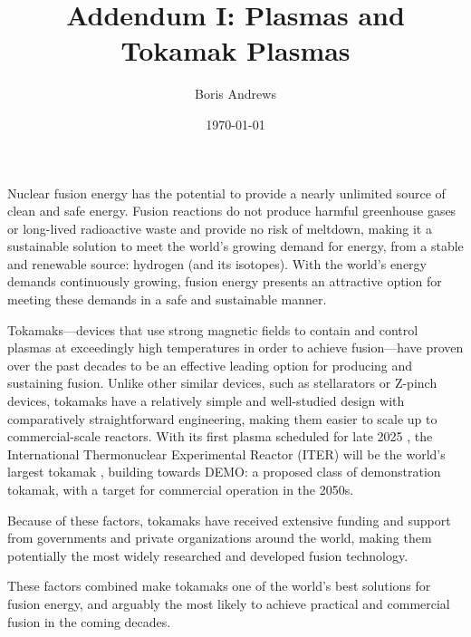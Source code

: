 \documentclass[12pt, a4paper]{article}
\title{Addendum I: Plasmas and Tokamak Plasmas}
\author{Boris Andrews}
\affil{Mathematical Institute, University of Oxford}
\date{\today}
\begin{document}
    \maketitle
    
    
    \tableofcontents
    \line


    Nuclear fusion energy has the potential to provide a nearly unlimited source of clean and safe energy. Fusion reactions do not produce harmful greenhouse gases or long-lived radioactive waste and provide no risk of meltdown, making it a sustainable solution to meet the world's growing demand for energy, from a stable and renewable source: hydrogen (and its isotopes). With the world's energy demands continuously growing, fusion energy presents an attractive option for meeting these demands in a safe and sustainable manner.

    \shortline

    Tokamaks---devices that use strong magnetic fields to contain and control plasmas at exceedingly high temperatures in order to achieve fusion---have proven over the past decades to be an effective leading option for producing and sustaining fusion. Unlike other similar devices, such as stellarators or Z-pinch devices, tokamaks have a relatively simple and well-studied  design with comparatively straightforward engineering, making them easier to scale up to commercial-scale reactors. With its first plasma scheduled for late 2025 \cite{ITER_schedule}, the International Thermonuclear Experimental Reactor (ITER) will be the world's largest tokamak \cite{Meade_2009, ITER_plan}, building towards DEMO: a proposed class of demonstration tokamak, with a target for commercial operation in the 2050s.
    
    Because of these factors, tokamaks have received extensive funding and support from governments and private organizations around the world, making them potentially the most widely researched and developed fusion technology.
    
    These factors combined make tokamaks one of the world's best solutions for fusion energy, and arguably the most likely to achieve practical and commercial fusion in the coming decades.
\end{document}
